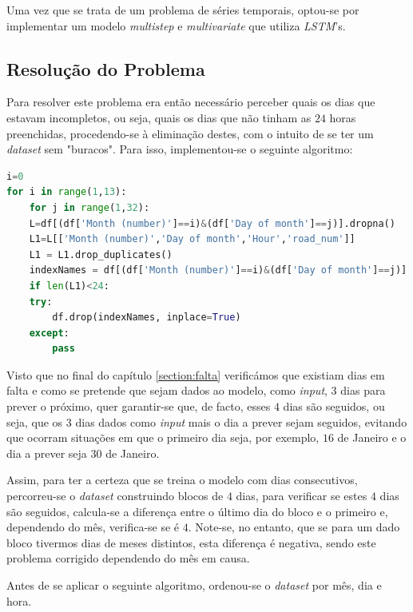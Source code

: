 \documentclass[a4paper, 12pt]{article}
\begin{document}
Uma vez que se trata de um problema de séries temporais, optou-se por implementar um modelo \textit{multistep} e \textit{multivariate} que utiliza \textit{LSTM}'s.

\subsection{Resolução do Problema}

Para resolver este problema era então necessário perceber quais os dias que estavam incompletos, ou seja, quais os dias que não tinham as $24$ horas preenchidas, procedendo-se à eliminação destes, com o intuito de se ter um \textit{dataset} sem "buracos". Para isso, implementou-se o seguinte algoritmo:

\begin{lstlisting}[language=Python]
i=0
for i in range(1,13):
	for j in range(1,32):
	L=df[(df['Month (number)']==i)&(df['Day of month']==j)].dropna()
	L1=L[['Month (number)','Day of month','Hour','road_num']]
	L1 = L1.drop_duplicates()
	indexNames = df[(df['Month (number)']==i)&(df['Day of month']==j)].index
	if len(L1)<24:
	try:
		df.drop(indexNames, inplace=True)
	except:
		pass
\end{lstlisting}

Visto que no final do capítulo \ref{section:falta} verificámos que existiam dias em falta e como se pretende que sejam dados ao modelo, como \textit{input}, $3$ dias para prever o próximo, quer garantir-se que, de facto, esses $4$ dias são seguidos, ou seja, que os $3$ dias dados como \textit{input} mais o dia a prever sejam seguidos, evitando que ocorram situações em que o primeiro dia seja, por exemplo, $16$ de Janeiro e o dia a prever seja $30$ de Janeiro.

Assim, para ter a certeza que se treina o modelo com dias consecutivos, percorreu-se o \textit{dataset} construindo blocos de $4$ dias, para verificar se estes $4$ dias são seguidos, calcula-se a diferença entre o último dia do bloco e o primeiro e, dependendo do mês, verifica-se se é $4$. Note-se, no entanto, que se para um dado bloco tivermos dias de meses distintos, esta diferença é negativa, sendo este problema corrigido dependendo do mês em causa.

Antes de se aplicar o seguinte algoritmo, ordenou-se o \textit{dataset} por mês, dia e hora.
\end{document}

